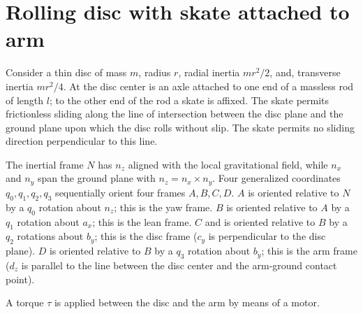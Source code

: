 \documentclass{article}
\begin{document}
\section{Rolling disc with skate attached to arm}
Consider a thin disc of mass $m$, radius $r$, radial inertia $mr^2/2$, and,
transverse inertia $mr^2/4$.  At the disc center is an axle attached to one end
of a massless rod of length $l$; to the other end of the rod a skate is
affixed.  The skate permits frictionless sliding along the line of intersection
between the disc plane and the ground plane upon which the disc rolls without
slip.  The skate permits no sliding direction perpendicular to this line.

The inertial frame $N$ has $n_z$ aligned with the local gravitational field,
while $n_x$ and $n_y$ span the ground plane with $n_z = n_x \times n_y$.  Four
generalized coordinates $q_0, q_1, q_2, q_3$ sequentially orient four frames
$A, B, C, D$.  $A$ is oriented relative to $N$ by a $q_0$ rotation about $n_z$;
this is the yaw frame.  $B$ is oriented relative to $A$ by a $q_1$ rotation
about $a_x$; this is the lean frame. $C$ and is oriented relative to $B$ by a
$q_2$ rotations about $b_y$; this is the disc frame ($c_y$ is perpendicular to
the disc plane).  $D$ is oriented relative to $B$ by a $q_3$ rotation about
$b_y$; this is the arm frame ($d_z$ is parallel to the line between the disc
center and the arm-ground contact point).

A torque $\tau$ is applied between the disc and the arm by means of a motor.
\end{document}
